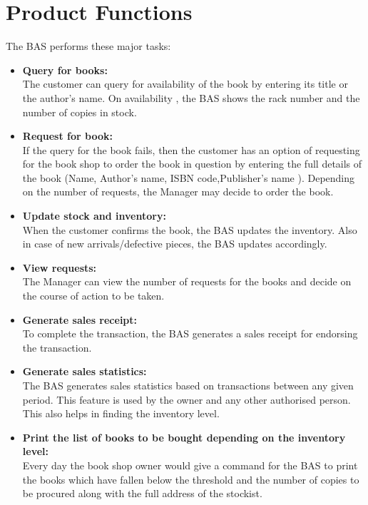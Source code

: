 \documentclass{scrreprt}
\begin{document}
\section{Product Functions}
The BAS performs these major tasks:
\\
\begin{itemize}
\item \textbf{Query for books:}\\
The customer can query for availability of the book by entering its title or the author's name. On availability , the BAS shows the rack number and the number of copies in stock.

\item \textbf{Request for book:}\\
If the query for the book fails, then the customer has an option of requesting for the book shop to order the book in question by entering the full details of the book (Name, Author's name, ISBN code,Publisher's name ). Depending on the number of requests, the Manager may decide to order the book.

\item \textbf{Update stock and inventory:}\\
When the customer confirms the book, the BAS updates the inventory. Also in case of new arrivals/defective pieces, the BAS updates accordingly.

\item \textbf{View requests:}\\
The Manager can view the number of requests for the books and decide on the course of action to be taken.

\item \textbf{Generate sales receipt:}\\
	To complete the transaction, the BAS generates a sales receipt for endorsing the 	transaction.

\item \textbf{Generate sales statistics:}\\	
	The BAS generates sales statistics based on transactions between any given period. This 	feature is used by the owner and any other authorised person. This also helps in finding 	the inventory level.                                      

\item \textbf{Print the list of books to be bought depending on the inventory level:}\\	
	Every day the book shop owner would give a command for the BAS to print
 the books 	which have fallen below the threshold and the number of copies to be procured 	along 	with the full
 address of the stockist.
 
 \end{itemize}
\end{document}
